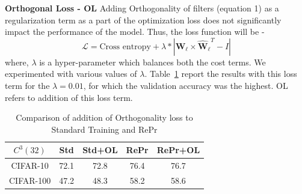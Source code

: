 \textbf{Orthogonal Loss - OL}
Adding Orthogonality of filters (equation 1) as a regularization term as a part of the optimization loss does not significantly impact the performance of the model.
Thus, the loss function will be -
\begin{equation*}
    \mathcal{L} = \text{Cross entropy} + \lambda * |\boldsymbol{\hat{W}_\ell} \times \boldsymbol{\hat{W}_\ell}^T - I |
\end{equation*}
where, $\lambda$ is a hyper-parameter which balances both the cost terms. We experimented with various values of $\lambda$. Table~\ref{tbl:ortho_loss} report the results with this loss term for the $\lambda = 0.01$, for which the validation accuracy was the highest. OL refers to addition of this loss term.

\begin{table}[H]
\center
\begin{tabular}{ccccc}
\toprule
          $C^3(32)$ & \multicolumn{1}{c}{\textbf{Std}} & \multicolumn{1}{c}{\textbf{Std+OL}} & \multicolumn{1}{c}{\textbf{RePr}} & \multicolumn{1}{c}{\textbf{RePr+OL}} \\ \hline
CIFAR-10  & 72.1                                                     & 72.8                                                    & 76.4                                                      & {\color[HTML]{3166FF} 76.7}                                                         \\
CIFAR-100 & 47.2                                                     & 48.3                                                    & 58.2                                                      & {\color[HTML]{3166FF} 58.6}                                                        \\ \bottomrule
\end{tabular}
\caption[Orthogonality Loss]{Comparison of addition of Orthogonality loss to Standard Training and RePr}
\label{tbl:ortho_loss}
\end{table}


